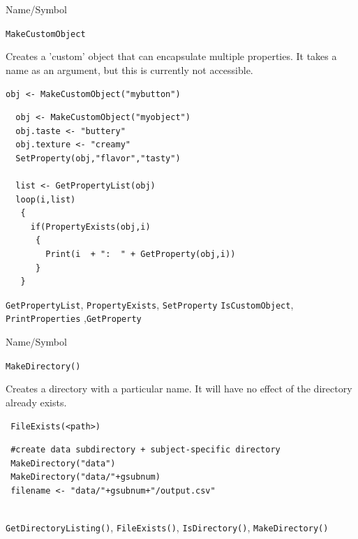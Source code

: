 \begin{desc}{Name/Symbol}
\item[Name/Symbol] \verb+MakeCustomObject+ 

\item[Description]  
Creates a 'custom' object that can encapsulate multiple properties. It takes a name as an argument, but this is currently not accessible.
  
\item[Usage]       
     \verb+obj <- MakeCustomObject("mybutton")+ 
\item[Example]

\begin{verbatim}
  obj <- MakeCustomObject("myobject")
  obj.taste <- "buttery"
  obj.texture <- "creamy"
  SetProperty(obj,"flavor","tasty")
  
  list <- GetPropertyList(obj)
  loop(i,list)
   {
     if(PropertyExists(obj,i)
      {
        Print(i  + ":  " + GetProperty(obj,i))
      }
   }

\end{verbatim}


\item[See Also]
\verb+GetPropertyList+, \verb+PropertyExists+, \verb+SetProperty+ \verb+IsCustomObject+, \verb+PrintProperties+ ,\verb+GetProperty+
\end{desc} 


\begin{desc}{Name/Symbol}
\item[Name/Symbol]	\verb+MakeDirectory()+

\item[Description]	Creates a directory with a particular name. It will have no effect of the directory already exists.
\item[Usage]		
\begin{verbatim}
 FileExists(<path>)
\end{verbatim}

\item[Example]	
\begin{verbatim}
 #create data subdirectory + subject-specific directory
 MakeDirectory("data")
 MakeDirectory("data/"+gsubnum)
 filename <- "data/"+gsubnum+"/output.csv"
  
\end{verbatim}

\item[See Also]\verb+GetDirectoryListing()+, \verb+FileExists()+,       \verb+IsDirectory()+,        
   \verb+MakeDirectory()+      

\end{desc}



